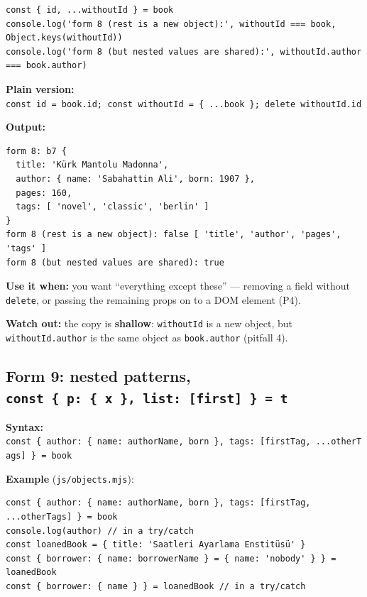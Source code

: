 \documentclass[
  10pt,
]{article}
\begin{document}
\begin{verbatim}
const { id, ...withoutId } = book
console.log('form 8 (rest is a new object):', withoutId === book, Object.keys(withoutId))
console.log('form 8 (but nested values are shared):', withoutId.author === book.author)
\end{verbatim}

\textbf{Plain version:}
\texttt{const\ id\ =\ book.\allowbreak{}id;\ const\ withoutId\ =\ \{\ .\allowbreak{}.\allowbreak{}.\allowbreak{}book\ \};\ delete\ withoutId.\allowbreak{}id}

\textbf{Output:}

\begin{verbatim}
form 8: b7 {
  title: 'Kürk Mantolu Madonna',
  author: { name: 'Sabahattin Ali', born: 1907 },
  pages: 160,
  tags: [ 'novel', 'classic', 'berlin' ]
}
form 8 (rest is a new object): false [ 'title', 'author', 'pages', 'tags' ]
form 8 (but nested values are shared): true
\end{verbatim}

\textbf{Use it when:} you want ``everything except these'' --- removing
a field without \texttt{delete}, or passing the remaining props on to a
DOM element (P4).

\textbf{Watch out:} the copy is \textbf{shallow}: \texttt{withoutId} is
a new object, but \texttt{withoutId.\allowbreak{}author} is the same
object as \texttt{book.\allowbreak{}author} (pitfall 4).

\hypertarget{form-9-nested-patterns-const--p--x--list-first---t}{%
\subsection{\texorpdfstring{Form 9: nested patterns,
\texttt{const\ \{\ p:\ \{\ x\ \},\ list:\ {[}first{]\allowbreak{}}\ \}\ =\ t}}{Form 9: nested patterns, }}\label{form-9-nested-patterns-const--p--x--list-first---t}}

\textbf{Syntax:}
\texttt{const\ \{\ author:\ \{\ name:\ authorName,\ born\ \},\ tags:\ {[}firstTag,\ .\allowbreak{}.\allowbreak{}.\allowbreak{}otherTags{]\allowbreak{}}\ \}\ =\ book}

\textbf{Example} (\texttt{js/\allowbreak{}objects.\allowbreak{}mjs}):

\begin{verbatim}
const { author: { name: authorName, born }, tags: [firstTag, ...otherTags] } = book
console.log(author) // in a try/catch
const loanedBook = { title: 'Saatleri Ayarlama Enstitüsü' }
const { borrower: { name: borrowerName } = { name: 'nobody' } } = loanedBook
const { borrower: { name } } = loanedBook // in a try/catch
\end{verbatim}
\end{document}
